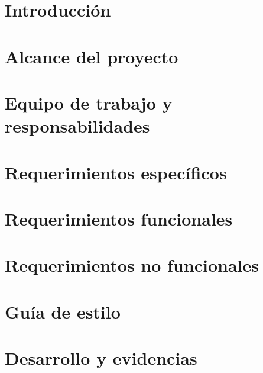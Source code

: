 \documentclass[12pt]{report}
\begin{document}
{%
\sectionfont{\scshape}


\section{Introducción}


\section{Alcance del proyecto}


\section{Equipo de trabajo y responsabilidades}


\section{Requerimientos específicos}


\section{Requerimientos funcionales}


\section{Requerimientos no funcionales}


\section{Guía de estilo}


\section{Desarrollo y evidencias}


}
\end{document}

